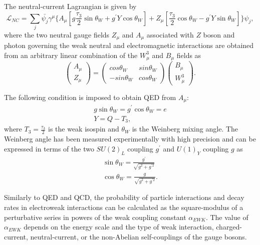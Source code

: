The neutral-current Lagrangian is given by 
\begin{equation}
\mathcal{L}_{NC} = \sum_{j}{ \bar{\psi_{j}} \gamma^{\mu} \{ A_{\mu} [ g \frac{\tau_{3}}{2} \sin\theta_{W} + g^{'} Y \cos\theta_{W} ] + Z_{\mu} [ \frac{\tau_{3}}{2} \cos\theta_{W} - g^{'} Y \sin\theta_{W}] \} \psi_{j} },
\label{eqn:SU2NCLag}
\end{equation}
where the two neutral gauge fields $Z_{\mu}$ and $A_{\mu}$ associated with $Z$ boson and photon governing the weak neutral and electromagnetic interactions are obtained from an arbitrary linear combination of the $W^{3}_{\mu}$ and $B_{\mu}$ fields as 
\begin{equation}
\begin{pmatrix} A_{\mu} \\ Z_{\mu} \end{pmatrix} =  \begin{pmatrix} cos{\theta_{W}} & sin{\theta_{W}} \\ -sin{\theta_{W}} & cos{\theta_{W}} \end{pmatrix} \begin{pmatrix} B_{\mu} \\ W^{3}_{\mu} \end{pmatrix}.
\label{eqn:NeutralGaugeBosons}
\end{equation}

The following condition is imposed to obtain QED from $A_{\mu}$:
\begin{equation}
\begin{array}{l}
g \sin\theta_{W} = g^{'} \cos\theta_{W} = e \\ 
Y= Q - T_{3},
\end{array}
\label{eqn:QEDFromEWk}
\end{equation}
where $T_{3}=\frac{\tau_{3}}{2}$ is the weak isospin and $\theta_{W}$ is the Weinberg mixing angle. The Weinberg angle has been measured experimentally with high precision and can be expressed in terms of the two $SU(2)_{L}$ coupling $g^{'}$ and $U(1)_{Y}$ coupling $g$ as
\begin{equation}
\begin{array}{l}
\sin\theta_{W} = \frac{g^{'}}{\sqrt{g^{2} +  g^{'2} }} \\ \cos\theta_{W} = \frac{g}{\sqrt{g^{2} +  g^{'2} }}.
\end{array}
\label{eqn:WeinbergAngle}
\end{equation}

Similarly to QED and QCD, the probability of particle interactions and decay rates in electroweak interactions can be calculated as the square-modulus of a perturbative series in powers of the weak coupling constant $\alpha _{EWK}$. The value of $\alpha _{EWK}$ depends on the energy scale and the type of weak interaction, charged-current, neutral-current, or the non-Abelian self-couplings of the gauge bosons. 

